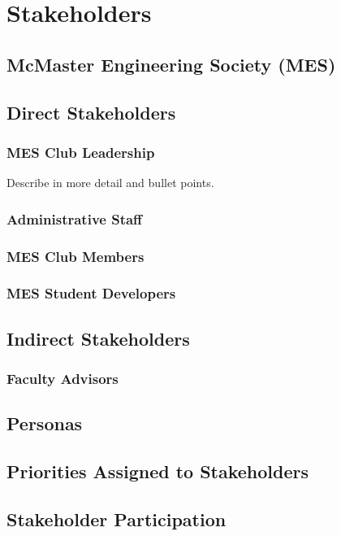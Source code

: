 \documentclass[12pt]{article}
\begin{document}
\section{Stakeholders}

  \subsection{McMaster Engineering Society (MES)}
  
  \subsection{Direct Stakeholders}
  
    \subsubsection{MES Club Leadership}
    Describe in more detail and bullet points.

    \subsubsection{Administrative Staff}
    \subsubsection{MES Club Members}
    \subsubsection{MES Student Developers}

  \subsection{Indirect Stakeholders}
    \subsubsection{Faculty Advisors}

  \subsection{Personas}
  \subsection{Priorities Assigned to Stakeholders}
  \subsection{Stakeholder Participation}
\end{document}
